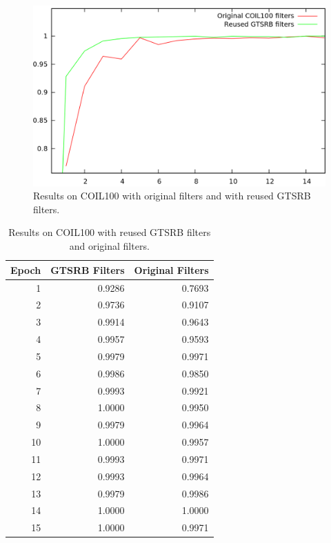\documentclass[11pt, a4paper]{article}
\begin{document}
\begin{figure}[h!]
	\centering
	\includegraphics[width=1\textwidth]{accuracy_plots/coil100_results}
	\caption{Results on COIL100 with original filters and with reused GTSRB filters.}
	\label{fig:coil100_results}
\end{figure}
\begin{table}[h!]
	\centering
	\begin{tabular}{|r|rr|}
		\hline
		Epoch & GTSRB Filters & Original Filters\\ \hline
		1 & 0.9286 & 0.7693\\
		2 & 0.9736 & 0.9107\\
		3 & 0.9914 & 0.9643\\
		4 & 0.9957 & 0.9593\\
		5 & 0.9979 & 0.9971\\
		6 & 0.9986 & 0.9850\\
		7 & 0.9993 & 0.9921\\
		8 & 1.0000 & 0.9950\\
		9 & 0.9979 & 0.9964\\
		10 & 1.0000 & 0.9957\\
		11 & 0.9993 & 0.9971\\
		12 & 0.9993 & 0.9964\\
		13 & 0.9979 & 0.9986\\
		14 & 1.0000 & 1.0000\\
		15 & 1.0000 & 0.9971\\ \hline
	\end{tabular}

	\caption{Results on COIL100 with reused GTSRB filters and original filters.}
	\label{tab:coil-results}
\end{table}
\end{document}
